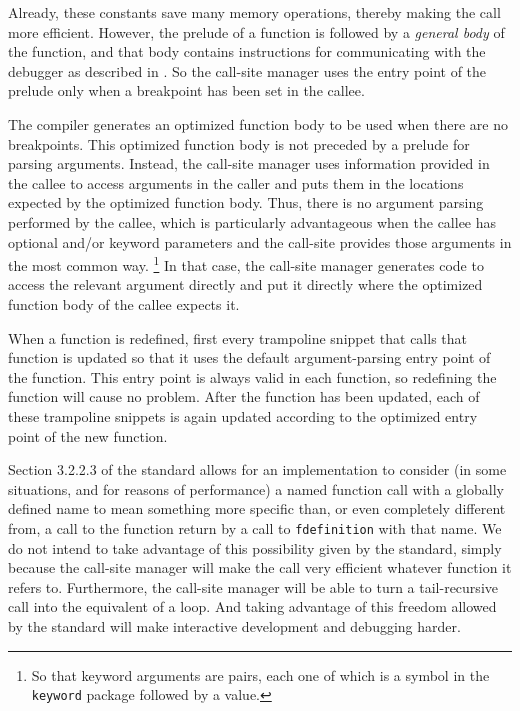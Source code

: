 Already, these constants save many memory operations, thereby making
the call more efficient.  However, the prelude of a function is
followed by a \emph{general body} of the function, and that body
contains instructions for communicating with the debugger as described
in .  So the call-site manager uses the entry
point of the prelude only when a breakpoint has been set in the
callee.

The compiler generates an optimized function body to be used when
there are no breakpoints.  This optimized function body is not
preceded by a prelude for parsing arguments.  Instead, the call-site
manager uses information provided in the callee to access arguments in
the caller and puts them in the locations expected by the optimized
function body.  Thus, there is no argument parsing performed by the
callee, which is particularly advantageous when the callee has
optional and/or keyword parameters and the call-site provides those
arguments in the most common way.%
\footnote{So that keyword arguments are pairs, each one of which is a
  symbol in the \texttt{keyword} package followed by a value.}
In that case, the call-site manager generates code to access the
relevant argument directly and put it directly where the optimized
function body of the callee expects it.

When a function is redefined, first every trampoline snippet that calls
that function is updated so that it uses the default argument-parsing
entry point of the function.  This entry point is always valid in each
function, so redefining the function will cause no problem.  After the
function has been updated, each of these trampoline snippets is again
updated according to the optimized entry point of the new function.

Section 3.2.2.3 of the \commonlisp{} standard allows for an
implementation to consider (in some situations, and for reasons of
performance) a named function call with a globally defined name to
mean something more specific than, or even completely different from,
a call to the function return by a call to \texttt{fdefinition} with
that name.  We do not intend to take advantage of this possibility
given by the standard, simply because the call-site manager will make
the call very efficient whatever function it refers to.  Furthermore,
the call-site manager will be able to turn a tail-recursive call into
the equivalent of a loop.  And taking advantage of this freedom
allowed by the standard will make interactive development and
debugging harder.

